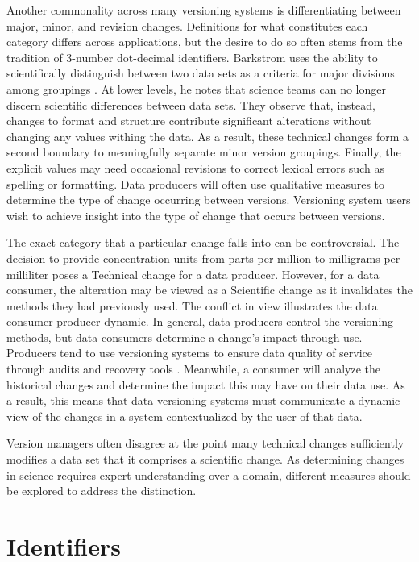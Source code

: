 Another commonality across many versioning systems is differentiating between major, minor, and revision changes.
Definitions for what constitutes each category differs across applications, but the desire to do so often stems from the tradition of 3-number dot-decimal identifiers.
Barkstrom uses the ability to scientifically distinguish between two data sets as a criteria for major divisions among groupings \cite{Barkstrom2003}.
At lower levels, he notes that science teams can no longer discern scientific differences between data sets.
They observe that, instead, changes to format and structure contribute significant alterations without changing any values withing the data.
As a result, these technical changes form a second boundary to meaningfully separate minor version groupings.
Finally, the explicit values may need occasional revisions to correct lexical errors such as spelling or formatting.
Data producers will often use qualitative measures to determine the type of change occurring between versions.
Versioning system users wish to achieve insight into the type of change that occurs between versions.

The exact category that a particular change falls into can be controversial.
The decision to provide concentration units from parts per million to milligrams per milliliter poses a Technical change for a data producer.
However, for a data consumer, the alteration may be viewed as a Scientific change as it invalidates the methods they had previously used.
The conflict in view illustrates the data consumer-producer dynamic.
In general, data producers control the versioning methods, but data consumers determine a change's impact through use.
Producers tend to use versioning systems to ensure data quality of service through audits and recovery tools \cite{Cavanaugh2002}.
Meanwhile, a consumer will analyze the historical changes and determine the impact this may have on their data use.
As a result, this means that data versioning systems must communicate a dynamic view of the changes in a system contextualized by the user of that data.

Version managers often disagree at the point many technical changes sufficiently modifies a data set that it comprises a scientific change.
As determining changes in science requires expert understanding over a domain, different measures should be explored to address the distinction.

\section{Identifiers}\label{sec:identifier}

